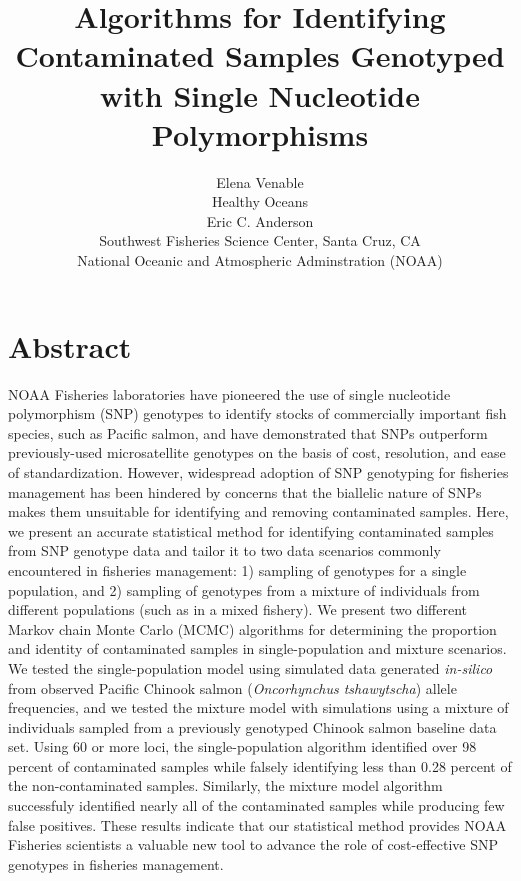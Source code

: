 \documentclass[12pt]{article}
\begin{document}
\normalem

\setlength{\parindent}{0cm}
\title{\textbf{Algorithms for Identifying Contaminated Samples Genotyped with Single Nucleotide Polymorphisms}}
\author{\Large Elena Venable\\ 
	Healthy Oceans\\
	Eric C. Anderson\\
	Southwest Fisheries Science Center, Santa Cruz, CA\\
	National Oceanic and Atmospheric Adminstration (NOAA)
  \date{}}
\maketitle

\section*{Abstract} 
NOAA Fisheries laboratories have pioneered the use of single nucleotide polymorphism (SNP) genotypes to identify stocks of commercially
important fish species, such as Pacific salmon, and have demonstrated that SNPs outperform previously-used microsatellite genotypes on the
basis of cost, resolution, and ease of standardization. However, widespread adoption of SNP genotyping for fisheries management has been
hindered by concerns that the biallelic nature of SNPs makes them unsuitable for identifying and removing contaminated samples. Here, we
present an accurate statistical method for identifying contaminated samples from SNP genotype data and tailor it to two data scenarios
commonly encountered in fisheries management: 1) sampling of genotypes for a single population, and 2) sampling of genotypes from a mixture
of individuals from different populations (such as in a mixed fishery). We present two different Markov chain Monte Carlo (MCMC) algorithms
for determining the proportion and identity of contaminated samples in single-population and mixture scenarios. We tested the 
single-population model using simulated data generated {\em in-silico} from observed Pacific Chinook salmon
(\textit{Oncorhynchus tshawytscha}) allele frequencies, and we tested the mixture model with simulations using a mixture of individuals
sampled from a previously genotyped Chinook salmon baseline data set. Using 60 or more loci, the single-population algorithm identified over
98 percent of contaminated samples while falsely identifying less than 0.28 percent of the non-contaminated samples.  Similarly, the mixture
model algorithm successfuly identified nearly all of the contaminated samples while producing few false positives. These results indicate
that our statistical method provides NOAA Fisheries scientists a valuable new tool to advance the role of cost-effective SNP genotypes in
fisheries management.
\end{document}
